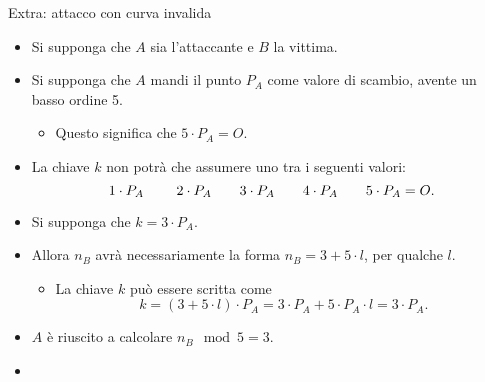 \documentclass[11pt,svgnames,smaller,aspectratio=169,italian]{beamer}
\newcommand{\extraend}{
   \setcounter{framenumber}{\value{finalframe}}
}
\begin{document}
\begin{frame}{Extra: attacco con curva invalida}
	\begin{itemize}
		\item Si supponga che $A$ sia l'attaccante e $B$ la vittima.
		\item Si supponga che $A$ mandi il punto $P_{A}$ come valore di scambio, avente un basso ordine 5.
			\begin{itemize}
				\item Questo significa che $5 \cdot P_{A} = O$.
			\end{itemize}
		\item La chiave $k$ non potrà che assumere uno tra i seguenti valori:
			\begin{equation*}
				1 \cdot P_{A} \quad\text{\emph{}}\quad 2 \cdot P_{A} \quad\text{\emph{}}\quad 3 \cdot P_{A} \quad\text{\emph{}}\quad 4 \cdot P_{A} \quad\text{\emph{}}\quad 5 \cdot P_{A} = O.
			\end{equation*}
		\item Si supponga che $k = 3 \cdot P_{A}$.
		\item Allora $n_{B}$ avrà necessariamente la forma $n_{B} = 3 + 5 \cdot l$, per qualche $l$.
			\begin{itemize}
				\item La chiave $k$ può essere scritta come
					\begin{equation*}
						k = (3 + 5 \cdot l) \cdot P_{A}  = 3 \cdot P_{A} + 5 \cdot P_{A} \cdot l = 3 \cdot P_{A}.
					\end{equation*}
			\end{itemize}
		\item $A$ è riuscito a calcolare $n_{B} \mod 5 = 3$.
	\end{itemize}
\end{frame}

\begin{frame}{}
	\begin{itemize}
		\item 
	\end{itemize}
\end{frame}

\extraend
















\end{document}
